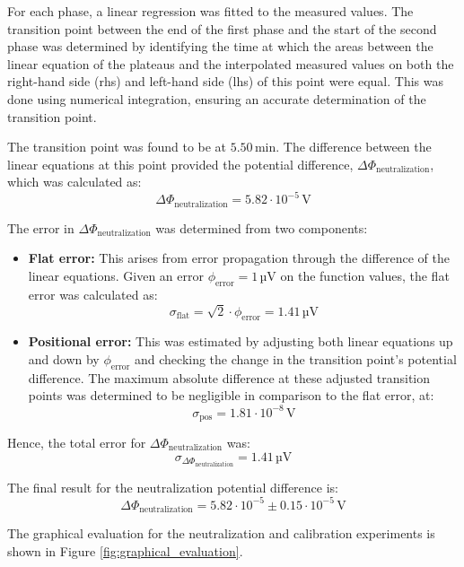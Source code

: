 \documentclass[a4paper,12pt]{article}
\begin{document}
For each phase, a linear regression was fitted to the measured values. The transition point between the end of the first phase and the start of the second phase was determined by identifying the time at which the areas between the linear equation of the plateaus and the interpolated measured values on both the right-hand side (rhs) and left-hand side (lhs) of this point were equal. This was done using numerical integration, ensuring an accurate determination of the transition point.

The transition point was found to be at \(5.50 \, \text{min}\). The difference between the linear equations at this point provided the potential difference, \(\Delta \Phi_{\text{neutralization}}\), which was calculated as:
\[
\Delta \Phi_{\text{neutralization}} = 5.82 \cdot 10^{-5} \, \text{V}
\]

The error in \(\Delta \Phi_{\text{neutralization}}\) was determined from two components:
\begin{itemize}
    \item \textbf{Flat error:} This arises from error propagation through the difference of the linear equations. Given an error \(\phi_{\text{error}} = 1 \, \text{µV}\) on the function values, the flat error was calculated as:
    \[
    \sigma_{\text{flat}} = \sqrt{2} \cdot \phi_{\text{error}} = 1.41 \, \text{µV}
    \]
    \item \textbf{Positional error:} This was estimated by adjusting both linear equations up and down by \(\phi_{\text{error}}\) and checking the change in the transition point’s potential difference. The maximum absolute difference at these adjusted transition points was determined to be negligible in comparison to the flat error, at:
    \[
    \sigma_{\text{pos}} = 1.81 \cdot 10^{-8} \, \text{V}
    \]
\end{itemize}

Hence, the total error for \(\Delta \Phi_{\text{neutralization}}\) was:
\[
\sigma_{\Delta \Phi_{\text{neutralization}}} = 1.41 \, \text{µV}
\]

The final result for the neutralization potential difference is:
\[
\Delta \Phi_{\text{neutralization}} = 5.82 \cdot 10^{-5} \pm 0.15 \cdot 10^{-5} \, \text{V}
\]

The graphical evaluation for the neutralization and calibration experiments is shown in Figure \ref{fig:graphical_evaluation}.
\end{document}
